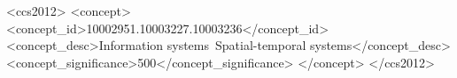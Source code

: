 \documentclass[sigconf]{acmart}
\begin{document}


\begin{CCSXML}
<ccs2012>
   <concept>
       <concept_id>10002951.10003227.10003236</concept_id>
       <concept_desc>Information systems~Spatial-temporal systems</concept_desc>
       <concept_significance>500</concept_significance>
       </concept>
 </ccs2012>
\end{CCSXML}

\maketitle
\end{document}

